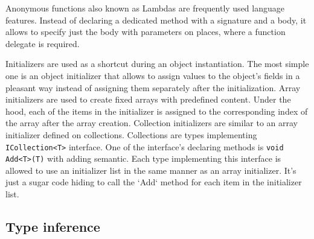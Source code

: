 Anonymous functions also known as Lambdas are frequently used language features.
Instead of declaring a dedicated method with a signature and a body, it allows to specify just the body with parameters on places, where a function delegate is required.
\par
{}
Initializers are used as a shortcut during an object instantiation.
The most simple one is an object initializer that allows to assign values to the object's fields in a pleasant way instead of assigning them separately after the initialization.
Array initializers are used to create fixed arrays with predefined content.
Under the hood, each of the items in the initializer is assigned to the corresponding index of the array after the array creation.
Collection initializers are similar to an array initializer defined on collections.
Collections are types implementing \texttt{ICollection<T>} interface.
One of the interface's declaring methods is \texttt{void Add<T>(T)} with adding semantic.
Each type implementing this interface is allowed to use an initializer list in the same manner as an array initializer.
It's just a sugar code hiding to call the `Add` method for each item in the initializer list.

\subsection{Type inference}


